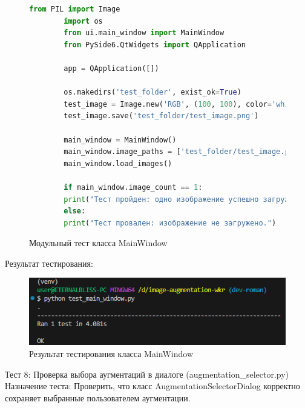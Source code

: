\begin{figure}[H]
	\begin{lstlisting}[language=Python]
		from PIL import Image
		import os
		from ui.main_window import MainWindow
		from PySide6.QtWidgets import QApplication
		
		app = QApplication([])
		
		os.makedirs('test_folder', exist_ok=True)
		test_image = Image.new('RGB', (100, 100), color='white')
		test_image.save('test_folder/test_image.png')
		
		main_window = MainWindow()
		main_window.image_paths = ['test_folder/test_image.png']
		main_window.load_images()
		
		if main_window.image_count == 1:
		print("Тест пройден: одно изображение успешно загружено.")
		else:
		print("Тест провален: изображение не загружено.")
	\end{lstlisting}  
	\caption{Модульный тест класса MainWindow}
	\label{model_test:test7}
\end{figure}

Результат тестирования:
\begin{figure}[H]
	\centering
	\includegraphics[width=0.7\linewidth]{images/resulttest7}
	\caption{Результат тестирования класса MainWindow}
	\label{fig:resulttest7}
\end{figure}

Тест 8: Проверка выбора аугментаций в диалоге (augmentation\_selector.py)
Назначение теста: Проверить, что класс AugmentationSelectorDialog корректно сохраняет выбранные пользователем аугментации.

